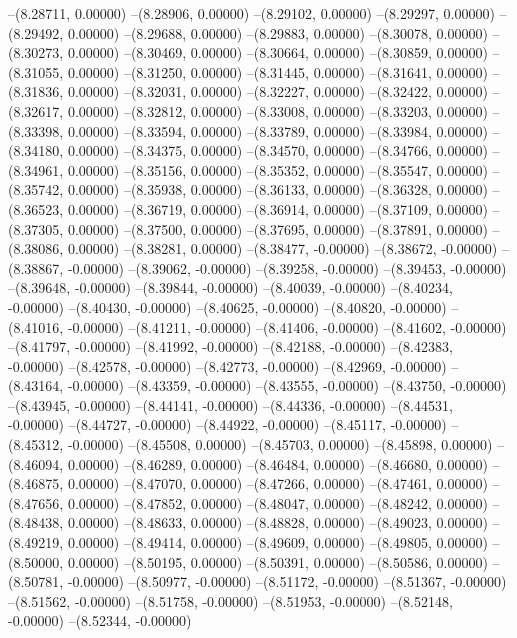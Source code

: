 --(8.28711, 0.00000)
--(8.28906, 0.00000)
--(8.29102, 0.00000)
--(8.29297, 0.00000)
--(8.29492, 0.00000)
--(8.29688, 0.00000)
--(8.29883, 0.00000)
--(8.30078, 0.00000)
--(8.30273, 0.00000)
--(8.30469, 0.00000)
--(8.30664, 0.00000)
--(8.30859, 0.00000)
--(8.31055, 0.00000)
--(8.31250, 0.00000)
--(8.31445, 0.00000)
--(8.31641, 0.00000)
--(8.31836, 0.00000)
--(8.32031, 0.00000)
--(8.32227, 0.00000)
--(8.32422, 0.00000)
--(8.32617, 0.00000)
--(8.32812, 0.00000)
--(8.33008, 0.00000)
--(8.33203, 0.00000)
--(8.33398, 0.00000)
--(8.33594, 0.00000)
--(8.33789, 0.00000)
--(8.33984, 0.00000)
--(8.34180, 0.00000)
--(8.34375, 0.00000)
--(8.34570, 0.00000)
--(8.34766, 0.00000)
--(8.34961, 0.00000)
--(8.35156, 0.00000)
--(8.35352, 0.00000)
--(8.35547, 0.00000)
--(8.35742, 0.00000)
--(8.35938, 0.00000)
--(8.36133, 0.00000)
--(8.36328, 0.00000)
--(8.36523, 0.00000)
--(8.36719, 0.00000)
--(8.36914, 0.00000)
--(8.37109, 0.00000)
--(8.37305, 0.00000)
--(8.37500, 0.00000)
--(8.37695, 0.00000)
--(8.37891, 0.00000)
--(8.38086, 0.00000)
--(8.38281, 0.00000)
--(8.38477, -0.00000)
--(8.38672, -0.00000)
--(8.38867, -0.00000)
--(8.39062, -0.00000)
--(8.39258, -0.00000)
--(8.39453, -0.00000)
--(8.39648, -0.00000)
--(8.39844, -0.00000)
--(8.40039, -0.00000)
--(8.40234, -0.00000)
--(8.40430, -0.00000)
--(8.40625, -0.00000)
--(8.40820, -0.00000)
--(8.41016, -0.00000)
--(8.41211, -0.00000)
--(8.41406, -0.00000)
--(8.41602, -0.00000)
--(8.41797, -0.00000)
--(8.41992, -0.00000)
--(8.42188, -0.00000)
--(8.42383, -0.00000)
--(8.42578, -0.00000)
--(8.42773, -0.00000)
--(8.42969, -0.00000)
--(8.43164, -0.00000)
--(8.43359, -0.00000)
--(8.43555, -0.00000)
--(8.43750, -0.00000)
--(8.43945, -0.00000)
--(8.44141, -0.00000)
--(8.44336, -0.00000)
--(8.44531, -0.00000)
--(8.44727, -0.00000)
--(8.44922, -0.00000)
--(8.45117, -0.00000)
--(8.45312, -0.00000)
--(8.45508, 0.00000)
--(8.45703, 0.00000)
--(8.45898, 0.00000)
--(8.46094, 0.00000)
--(8.46289, 0.00000)
--(8.46484, 0.00000)
--(8.46680, 0.00000)
--(8.46875, 0.00000)
--(8.47070, 0.00000)
--(8.47266, 0.00000)
--(8.47461, 0.00000)
--(8.47656, 0.00000)
--(8.47852, 0.00000)
--(8.48047, 0.00000)
--(8.48242, 0.00000)
--(8.48438, 0.00000)
--(8.48633, 0.00000)
--(8.48828, 0.00000)
--(8.49023, 0.00000)
--(8.49219, 0.00000)
--(8.49414, 0.00000)
--(8.49609, 0.00000)
--(8.49805, 0.00000)
--(8.50000, 0.00000)
--(8.50195, 0.00000)
--(8.50391, 0.00000)
--(8.50586, 0.00000)
--(8.50781, -0.00000)
--(8.50977, -0.00000)
--(8.51172, -0.00000)
--(8.51367, -0.00000)
--(8.51562, -0.00000)
--(8.51758, -0.00000)
--(8.51953, -0.00000)
--(8.52148, -0.00000)
--(8.52344, -0.00000)

